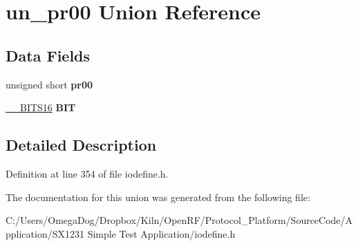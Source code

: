 \hypertarget{unionun__pr00}{\section{un\-\_\-pr00 Union Reference}
\label{unionun__pr00}
}
\subsection*{Data Fields}
\begin{DoxyCompactItemize}
\item 
\hypertarget{unionun__pr00_afc51b6bec23fe932d56c6ac62997ba8e}{unsigned short {\bfseries pr00}}\label{unionun__pr00_afc51b6bec23fe932d56c6ac62997ba8e}

\item 
\hypertarget{unionun__pr00_a86260d5cbe20504fe2c63865b5e555c6}{\hyperlink{struct_____b_i_t_s16}{\-\_\-\-\_\-\-B\-I\-T\-S16} {\bfseries B\-I\-T}}\label{unionun__pr00_a86260d5cbe20504fe2c63865b5e555c6}

\end{DoxyCompactItemize}


\subsection{Detailed Description}


Definition at line 354 of file iodefine.\-h.



The documentation for this union was generated from the following file\-:\begin{DoxyCompactItemize}
\item 
C\-:/\-Users/\-Omega\-Dog/\-Dropbox/\-Kiln/\-Open\-R\-F/\-Protocol\-\_\-\-Platform/\-Source\-Code/\-Application/\-S\-X1231 Simple Test Application/iodefine.\-h\end{DoxyCompactItemize}
